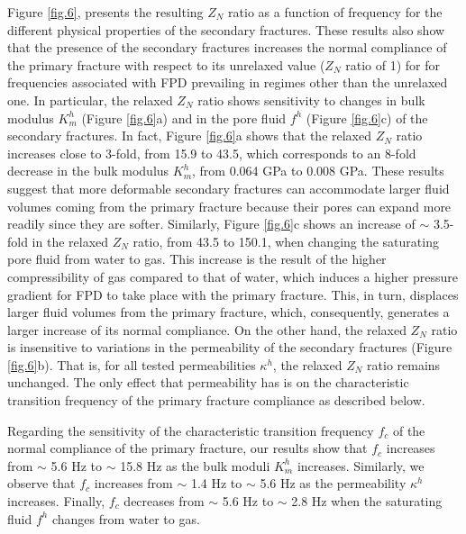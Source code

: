 \documentclass[draft]{agujournal2019}
\begin{document}
Figure \ref{fig.6}, presents the resulting $Z_N$ ratio as a function of frequency for the different physical properties of the secondary fractures.
These results also show that the presence of the secondary fractures  increases  the normal compliance of the primary fracture with respect to its unrelaxed value ($Z_N$ ratio of 1) for 
for frequencies associated with FPD prevailing in regimes
other than the unrelaxed one. 
In particular, the relaxed $Z_N$ ratio shows sensitivity to changes in bulk modulus $K_m^h$ (Figure \ref{fig.6}a) and in the pore fluid $f^h$ (Figure \ref{fig.6}c) of the secondary fractures. In fact, Figure \ref{fig.6}a shows that the relaxed $Z_N$ ratio increases close to 3-fold, from 15.9 to 43.5, which corresponds to an 8-fold decrease in the bulk modulus $K_m^h$, from 0.064 GPa to 0.008 GPa. These results suggest that  more deformable secondary fractures can accommodate larger fluid volumes coming from the primary fracture because their pores can expand more readily since they are softer.
Similarly, Figure \ref{fig.6}c shows an increase of $\sim$ 3.5-fold in the relaxed $Z_N$ ratio, from 43.5 to 150.1, when changing the saturating pore fluid from water to gas. This increase is the result of the higher compressibility of gas compared to that of water, which induces a higher pressure gradient for FPD to take place with the primary fracture. This, in turn, displaces larger fluid volumes from the primary fracture, which, consequently, generates a larger increase of its normal compliance.
On the other hand, the relaxed $Z_N$ ratio is insensitive to variations in the permeability of the secondary fractures (Figure \ref{fig.6}b). That is, for all tested permeabilities $\kappa^h$, the relaxed $Z_N$ ratio remains unchanged. The only effect that permeability has is on the characteristic transition frequency of the primary fracture compliance as described below.

Regarding the sensitivity of the characteristic transition frequency $f_c$ of the normal compliance of the primary fracture, our results show that $f_c$ increases from $\sim$ 5.6 Hz to $\sim$ 15.8 Hz as the bulk moduli $K_m^h$ increases. Similarly, we observe that $f_c$ increases from $\sim$ 1.4 Hz to $\sim$  5.6 Hz as the permeability $\kappa^h$ increases. Finally, $f_c$ decreases from $\sim$ 5.6 Hz to $\sim$ 2.8 Hz when the saturating fluid $f^h$ changes from water to gas.
\end{document}
